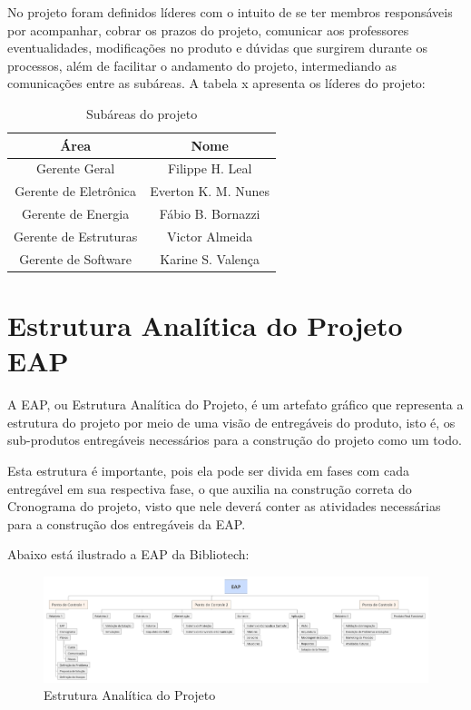 No projeto foram definidos líderes com o intuito de se ter membros responsáveis por acompanhar, cobrar os prazos do projeto, comunicar aos professores eventualidades, modificações no produto e dúvidas que surgirem durante os processos, além de facilitar o andamento do projeto, intermediando as comunicações entre as subáreas. A tabela x apresenta os líderes do projeto:

\begin{table}[h]
\caption{Subáreas do projeto}
\centering
\begin{tabular}{|c|c|} \hline
\textbf{Área} & \textbf{Nome}\\ \hline                               
Gerente Geral & Filippe H. Leal\\ \hline
Gerente de Eletrônica & Everton K. M. Nunes\\ \hline
Gerente de Energia & Fábio B. Bornazzi\\ \hline
Gerente de Estruturas & Victor Almeida\\ \hline
Gerente de Software & Karine S. Valença\\ \hline
\end{tabular}
\end{table}

\section{Estrutura Analítica do Projeto EAP}
A EAP, ou Estrutura Analítica do Projeto, é um artefato gráfico que representa a estrutura do projeto por meio de uma visão de entregáveis do produto, isto é, os sub-produtos entregáveis necessários para a construção do projeto como um todo.

Esta estrutura é importante, pois ela pode ser divida em fases com cada entregável em sua respectiva fase, o que auxilia na construção correta do Cronograma do projeto, visto que nele deverá conter as atividades necessárias para a construção dos entregáveis da EAP.

Abaixo está ilustrado a EAP da Bibliotech:
\begin{figure}[!htb]
     \centering
     \includegraphics[scale=1]{figuras/eap}
     \caption{Estrutura Analítica do Projeto}
     \label{Estrutura Analítica do Projeto}
\end{figure}

